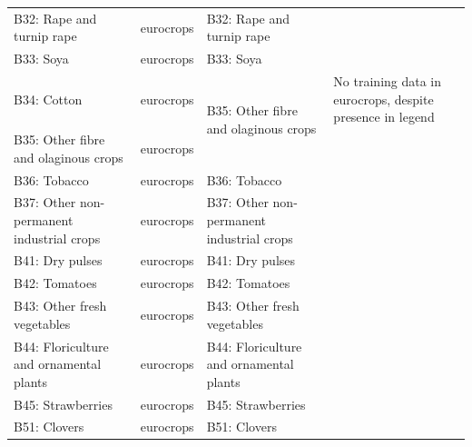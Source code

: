 \begin{table}[]
\begin{tabular}{l{2cm}lll}
B32: Rape and turnip rape                     & eurocrops               & B32: Rape and turnip rape                             &                                                           \\
B33: Soya                                     & eurocrops               & B33: Soya                                             &                                                           \\
B34: Cotton                                   & eurocrops               & \multirow{2}{*}{B35: Other fibre and olaginous crops} & No training data in eurocrops, despite presence in legend \\
B35: Other fibre and olaginous crops          & eurocrops               &                                                       &                                                           \\
B36: Tobacco                                  & eurocrops               & B36: Tobacco                                          &                                                           \\
B37: Other non-permanent industrial crops     & eurocrops               & B37: Other non-permanent industrial crops             &                                                           \\
B41: Dry pulses                               & eurocrops               & B41: Dry pulses                                       &                                                           \\
B42: Tomatoes                                 & eurocrops               & B42: Tomatoes                                         &                                                           \\
B43: Other fresh vegetables                   & eurocrops               & B43: Other fresh vegetables                           &                                                           \\
B44: Floriculture and ornamental plants       & eurocrops               & B44: Floriculture and ornamental plants               &                                                           \\
B45: Strawberries                             & eurocrops               & B45: Strawberries                                     &                                                           \\
B51: Clovers                                  & eurocrops               & B51: Clovers                                          &                                                           \\

\end{tabular}
\end{table}
